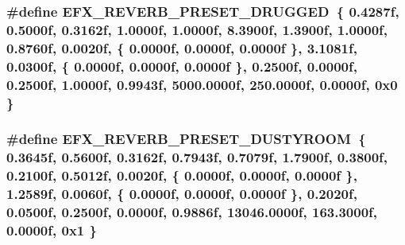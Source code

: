 \subsubsection[{\texorpdfstring{E\+F\+X\+\_\+\+R\+E\+V\+E\+R\+B\+\_\+\+P\+R\+E\+S\+E\+T\+\_\+\+D\+R\+U\+G\+G\+ED}{EFX_REVERB_PRESET_DRUGGED}}]{\setlength{\rightskip}{0pt plus 5cm}\#define E\+F\+X\+\_\+\+R\+E\+V\+E\+R\+B\+\_\+\+P\+R\+E\+S\+E\+T\+\_\+\+D\+R\+U\+G\+G\+ED~\{ 0.\+4287f, 0.\+5000f, 0.\+3162f, 1.\+0000f, 1.\+0000f, 8.\+3900f, 1.\+3900f, 1.\+0000f, 0.\+8760f, 0.\+0020f, \{ 0.\+0000f, 0.\+0000f, 0.\+0000f \}, 3.\+1081f, 0.\+0300f, \{ 0.\+0000f, 0.\+0000f, 0.\+0000f \}, 0.\+2500f, 0.\+0000f, 0.\+2500f, 1.\+0000f, 0.\+9943f, 5000.\+0000f, 250.\+0000f, 0.\+0000f, 0x0 \}}\hypertarget{efx-presets_8h_a45a589369c56c50c8e4017caafae954d}{}\label{efx-presets_8h_a45a589369c56c50c8e4017caafae954d}
\subsubsection[{\texorpdfstring{E\+F\+X\+\_\+\+R\+E\+V\+E\+R\+B\+\_\+\+P\+R\+E\+S\+E\+T\+\_\+\+D\+U\+S\+T\+Y\+R\+O\+OM}{EFX_REVERB_PRESET_DUSTYROOM}}]{\setlength{\rightskip}{0pt plus 5cm}\#define E\+F\+X\+\_\+\+R\+E\+V\+E\+R\+B\+\_\+\+P\+R\+E\+S\+E\+T\+\_\+\+D\+U\+S\+T\+Y\+R\+O\+OM~\{ 0.\+3645f, 0.\+5600f, 0.\+3162f, 0.\+7943f, 0.\+7079f, 1.\+7900f, 0.\+3800f, 0.\+2100f, 0.\+5012f, 0.\+0020f, \{ 0.\+0000f, 0.\+0000f, 0.\+0000f \}, 1.\+2589f, 0.\+0060f, \{ 0.\+0000f, 0.\+0000f, 0.\+0000f \}, 0.\+2020f, 0.\+0500f, 0.\+2500f, 0.\+0000f, 0.\+9886f, 13046.\+0000f, 163.\+3000f, 0.\+0000f, 0x1 \}}\hypertarget{efx-presets_8h_a89d300c1e9b8e0eef3cb9de72c18542d}{}\label{efx-presets_8h_a89d300c1e9b8e0eef3cb9de72c18542d}

